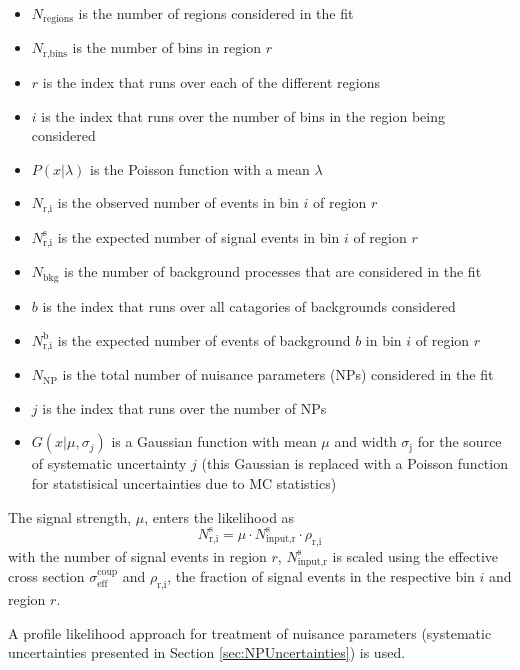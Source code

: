 \begin{itemize}
\item $N_{\text{regions}}$ is the number of regions considered in the fit
\item $N_\text{r,bins}$ is the number of bins in region $r$
\item $r$ is the index that runs over each of the different regions
\item $i$ is the index that runs over the number of bins in the region being considered
\item $P(x|\lambda)$ is the Poisson function with a mean $\lambda$
\item $N_\text{r,i}$ is the observed number of events in bin $i$ of region $r$
\item $N_\text{r,i}^\text{s}$ is the expected number of signal events in bin $i$ of region $r$
\item $N_\text{bkg}$ is the number of background processes that are considered in the fit
\item $b$ is the index that runs over all catagories of backgrounds considered
\item $N_\text{r,i}^\text{b}$ is the expected number of events of background $b$ in bin $i$ of region $r$
\item $N_\text{NP}$ is the total number of nuisance parameters (NPs) considered in the fit
\item $j$ is the index that runs over the number of NPs
\item $G(x|\mu,\sigma_{j})$ is a Gaussian function with mean $\mu$ and width $\sigma_\text{j}$ for the source of systematic uncertainty $j$ (this Gaussian is replaced with a Poisson function for statstisical uncertainties due to MC statistics)
\end{itemize}

The signal strength, $\mu$, enters the likelihood as
\[ N_\text{r,i}^\text{s} = \mu \cdot N_\text{input,r}^\text{s} \cdot \rho_\text{r,i}
\]
with the number of signal events in region $r$, $N_\text{input,r}^\text{s}$ is scaled using the effective cross section $\sigma_\text{eff}^\text{coup}$ and $\rho_\text{r,i}$, the fraction of signal events in the respective bin $i$ and region $r$. 


A profile likelihood approach for treatment of nuisance parameters\cite{Cowan:2010js} (systematic uncertainties presented in Section \ref{sec:NPUncertainties}) is used.

